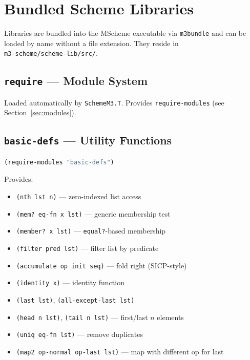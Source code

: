 \documentclass[12pt]{report}
\begin{document}
\chapter{Bundled Scheme Libraries}\label{ch:libraries}

Libraries are bundled into the MScheme executable via {\tt m3bundle}
and can be loaded by name without a file extension.  They reside in\\
{\tt m3-scheme/scheme-lib/src/}.

\section{{\tt require} --- Module System}

Loaded automatically by {\tt SchemeM3.T}.  Provides {\tt require-modules}
(see Section~\ref{sec:modules}).

\section{{\tt basic-defs} --- Utility Functions}

\begin{lstlisting}[language=Scheme]
(require-modules "basic-defs")
\end{lstlisting}

\noindent Provides:
\begin{itemize}
\item {\tt (nth lst n)} --- zero-indexed list access
\item {\tt (mem? eq-fn x lst)} --- generic membership test
\item {\tt (member? x lst)} --- {\tt equal?}-based membership
\item {\tt (filter pred lst)} --- filter list by predicate
\item {\tt (accumulate op init seq)} --- fold right (SICP-style)
\item {\tt (identity x)} --- identity function
\item {\tt (last lst)}, {\tt (all-except-last lst)}
\item {\tt (head n lst)}, {\tt (tail n lst)} --- first/last $n$ elements
\item {\tt (uniq eq-fn lst)} --- remove duplicates
\item {\tt (map2 op-normal op-last lst)} --- map with different op for last
\end{itemize}
\end{document}
